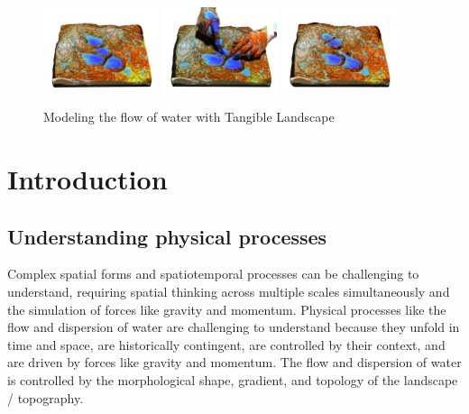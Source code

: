 \documentclass{isprs}
\begin{document}

\maketitle

\begin{figure}[ht!]
\begin{center}
		\includegraphics[width=0.3\textwidth]{figures/tl_fill_dir_1.png}
		\includegraphics[width=0.3\textwidth]{figures/tl_fill_dir_2.png}
		\includegraphics[width=0.3\textwidth]{figures/tl_fill_dir_3.png}
	\caption{Modeling the flow of water with Tangible Landscape}
	\label{fig:tl_flow}
\end{center}
\end{figure}

\section{Introduction}\label{sec:introduction}

\subsection{Understanding physical processes}
Complex spatial forms and spatiotemporal processes can be challenging to understand, requiring spatial thinking across multiple scales simultaneously and the simulation of forces like gravity and momentum. Physical processes like the flow and dispersion of water are challenging to understand because they unfold in time and space, are historically contingent, are controlled by their context, and are driven by forces like gravity and momentum. The flow and dispersion of water is controlled by the morphological shape, gradient, and topology of the landscape / topography.
\end{document}
